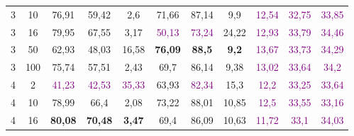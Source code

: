 \begin{table}[ht]
\begin{tabular}{cc|ccc|ccc|ccc}
        {3}                           & {10}   & {76,91}                             & {59,42}                             & {2,6}                                    & {71,66}                   & {87,14}                   & {9,9}                     & \textcolor{purple}{12,54} & \textcolor{purple}{32,75} & \textcolor{purple}{33,85} \\
        {3}                           & {16}   & {79,95}                             & {67,55}                             & {3,17}                                   & \textcolor{purple}{50,13} & \textcolor{purple}{73,24} & {24,22}                   & \textcolor{purple}{12,93} & \textcolor{purple}{33,79} & \textcolor{purple}{34,46} \\
        {3}                           & {50}   & {62,93}                             & {48,03}                             & {16,58}                                  & {\textbf{76,09}}          & {\textbf{88,5}}           & \textbf{9,2}              & \textcolor{purple}{13,67} & \textcolor{purple}{33,73} & \textcolor{purple}{34,29} \\
        {3}                           & {100}  & {75,74}                             & {57,51}                             & {2,43}                                   & {69,7}                    & {86,14}                   & {9,38}                    & \textcolor{purple}{13,02} & \textcolor{purple}{33,64} & \textcolor{purple}{34,2}  \\
        {4}                           & {2}    & \textcolor{purple}{41,23}           & \textcolor{purple}{42,53}           & \textcolor{purple}{35,33}                & {63,93}                   & \textcolor{purple}{82,34} & {15,3}                    & \textcolor{purple}{12,2}  & \textcolor{purple}{33,25} & \textcolor{purple}{33,64} \\
        {4}                           & {10}   & {78,99}                             & {66,4}                              & {2,08}                                   & {73,22}                   & {88,01}                   & {10,85}                   & \textcolor{purple}{12,5}  & \textcolor{purple}{33,55} & \textcolor{purple}{33,16} \\
        {4}                           & {16}   & {\textbf{80,08}}                    & {\textbf{70,48}}                    & {\textbf{3,47}}                          & {69,4}                    & {86,09}                   & {10,63}                   & \textcolor{purple}{11,72} & \textcolor{purple}{33,1}  & \textcolor{purple}{34,03} \\

\end{tabular}
\end{table}
